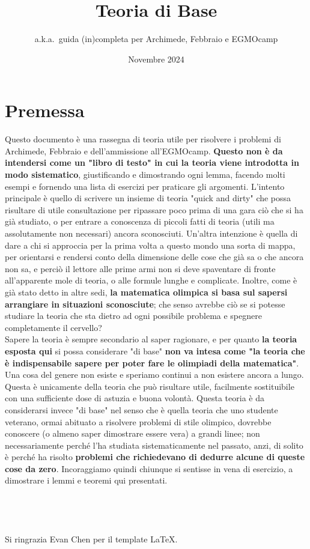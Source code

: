 \documentclass[11pt]{scrartcl}
\begin{document}
	\title{Teoria di Base}
	\subtitle{a.k.a.\ guida (in)completa per Archimede, Febbraio e EGMOcamp}
	\date{Novembre 2024}

	
	\maketitle
	\section*{Premessa}
	Questo documento è una rassegna di teoria utile per risolvere i problemi di Archimede, Febbraio e dell'ammissione all'EGMOcamp. \textbf{Questo non è da intendersi come un "libro di testo" in cui la teoria viene introdotta in modo sistematico}, giustificando e dimostrando ogni lemma, facendo molti esempi e fornendo una lista di esercizi per praticare gli argomenti. L'intento principale è quello di scrivere un insieme di teoria "quick and dirty" che possa risultare di utile consultazione per ripassare poco prima di una gara ciò che si ha già studiato, o per entrare a conoscenza di piccoli fatti di teoria (utili ma assolutamente non necessari) ancora sconosciuti. Un'altra intenzione è quella di dare a chi si approccia per la prima volta a questo mondo una sorta di mappa, per orientarsi e rendersi conto della dimensione delle cose che già sa o che ancora non sa, e perciò il lettore alle prime armi non si deve spaventare di fronte all'apparente mole di teoria, o alle formule lunghe e complicate. Inoltre, come è già stato detto in altre sedi, \textbf{la matematica olimpica si basa sul sapersi arrangiare in situazioni sconosciute}; che senso avrebbe ciò se si potesse studiare la teoria che sta dietro ad ogni possibile problema e spegnere completamente il cervello? \\
	Sapere la teoria è sempre secondario al saper ragionare, e per quanto \textbf{la teoria esposta qui} si possa considerare "di base" \textbf{non va intesa come "la teoria che è indispensabile sapere per poter fare le olimpiadi della matematica"}. Una cosa del genere non esiste e speriamo continui a non esistere ancora a lungo. Questa è unicamente della teoria che può risultare utile, facilmente sostituibile con una sufficiente dose di astuzia e buona volontà. Questa teoria è da considerarsi invece "di base" nel senso che è quella teoria che uno studente veterano, ormai abituato a risolvere problemi di stile olimpico, dovrebbe conoscere (o almeno saper dimostrare essere vera) a grandi linee; non necessariamente perché l'ha studiata sistematicamente nel passato, anzi, di solito è perché ha risolto \textbf{problemi che richiedevano di dedurre alcune di queste cose da zero}. Incoraggiamo quindi chiunque si sentisse in vena di esercizio, a dimostrare i lemmi e teoremi qui presentati. \\
	\\
	\\
	\\
	\\
	Si ringrazia Evan Chen per il template \LaTeX.
	\newpage
	\tableofcontents
	\newpage
\end{document}
